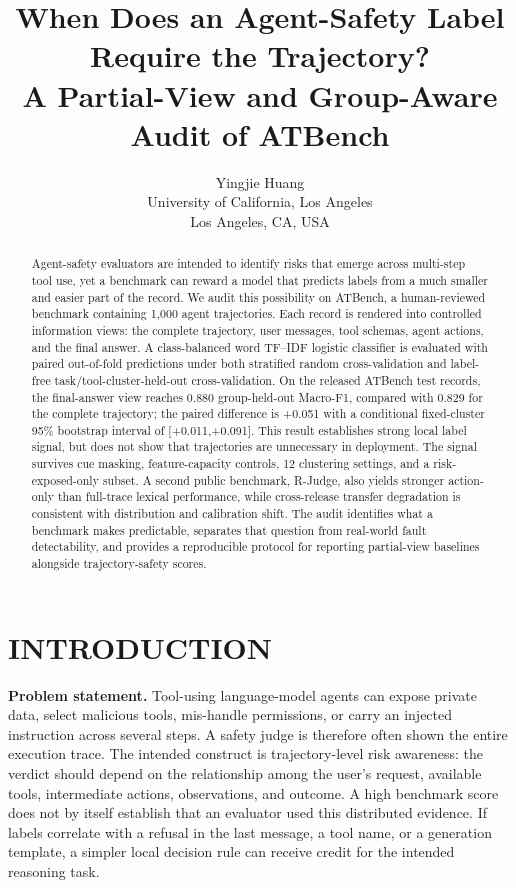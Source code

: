 \documentclass[10pt,twocolumn,twoside]{article}
\title{\textbf{When Does an Agent-Safety Label Require the Trajectory?\\
A Partial-View and Group-Aware Audit of ATBench}}
\author{Yingjie Huang\\
University of California, Los Angeles\\
Los Angeles, CA, USA}
\date{}
\begin{document}
\maketitle

\begin{abstract}
Agent-safety evaluators are intended to identify risks that emerge across multi-step
tool use, yet a benchmark can reward a model that predicts labels from a much
smaller and easier part of the record. We audit this possibility on ATBench, a
human-reviewed benchmark containing 1,000 agent trajectories. Each record is
rendered into controlled information views: the complete trajectory, user messages,
tool schemas, agent actions, and the final answer. A class-balanced word TF--IDF
logistic classifier is evaluated with paired out-of-fold predictions under both
stratified random cross-validation and label-free task/tool-cluster-held-out
cross-validation. On the released ATBench test records, the final-answer view
reaches 0.880 group-held-out Macro-F1, compared with 0.829 for the complete
trajectory; the paired difference is +0.051 with a conditional fixed-cluster 95\%
bootstrap interval of [+0.011,+0.091]. This result establishes strong local label
signal, but does not show that trajectories are unnecessary in deployment. The
signal survives cue masking, feature-capacity controls, 12 clustering settings, and
a risk-exposed-only subset. A second public benchmark, R-Judge, also yields stronger
action-only than full-trace lexical performance, while cross-release transfer
degradation is consistent with distribution and calibration shift. The audit identifies what a
benchmark makes predictable, separates that question from real-world fault
detectability, and provides a reproducible protocol for reporting partial-view
baselines alongside trajectory-safety scores.
\end{abstract}

\section{INTRODUCTION}

\textbf{Problem statement.}
Tool-using language-model agents can expose private data, select malicious tools,
mis-handle permissions, or carry an injected instruction across several steps. A
safety judge is therefore often shown the entire execution trace. The intended
construct is trajectory-level risk awareness: the verdict should depend on the
relationship among the user's request, available tools, intermediate actions,
observations, and outcome. A high benchmark score does not by itself establish that
an evaluator used this distributed evidence. If labels correlate with a refusal in
the last message, a tool name, or a generation template, a simpler local decision
rule can receive credit for the intended reasoning task.
\end{document}
